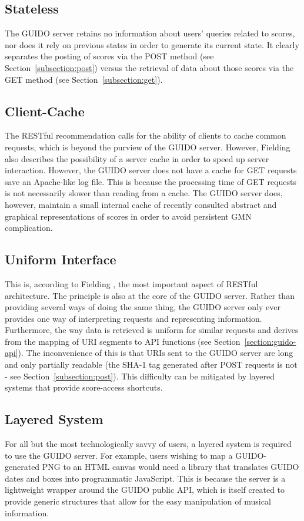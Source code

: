 \documentclass{article}
\begin{document}
\subsection{Stateless}
The GUIDO server retains no information about users' queries related to scores, nor does it rely on previous states in order to generate its current state.  It clearly separates the posting of scores via the POST method (see Section~\ref{subsection:post}) versus the retrieval of data about those scores via the GET method (see Section~\ref{subsection:get}).
\subsection{Client-Cache}
The RESTful recommendation calls for the ability of clients to cache common requests, which is beyond the purview of the GUIDO server.  However, Fielding \cite{Fielding00} also describes the possibility of a server cache in order to speed up server interaction.  However, the GUIDO server does not have a cache for GET requests save an Apache-like log file.  This is because the processing time of GET requests is not necessarily slower than reading from a cache.  The GUIDO server does, however, maintain a small internal cache of recently consulted abstract and graphical representations of \cite{Dau:09a} scores in order to avoid persistent GMN complication.
\subsection{Uniform Interface}
This is, according to Fielding \cite{Fielding00}, the most important aspect of RESTful architecture.  The principle is also at the core of the GUIDO server.  Rather than providing several ways of doing the same thing, the GUIDO server only ever provides one way of interpreting requests and representing information.  Furthermore, the way data is retrieved is uniform for similar requests and derives from the mapping of URI segments to API functions (see Section~\ref{section:guido-api}).  The inconvenience of this is that URIs sent to the GUIDO server are long and only partially readable (the SHA-1 tag generated after POST requests is not - see Section~\ref{subsection:post}).  This difficulty can be mitigated by layered systems that provide score-access shortcuts.
\subsection{Layered System}
For all but the most technologically savvy of users, a layered system is required to use the GUIDO server.  For example, users wishing to map a GUIDO-generated PNG to an HTML canvas would need a library that translates GUIDO dates and boxes into programmatic JavaScript.  This is because the server is a lightweight wrapper around the GUIDO public API, which is itself created to provide  generic structures that allow for the easy manipulation of musical information.
\end{document}
